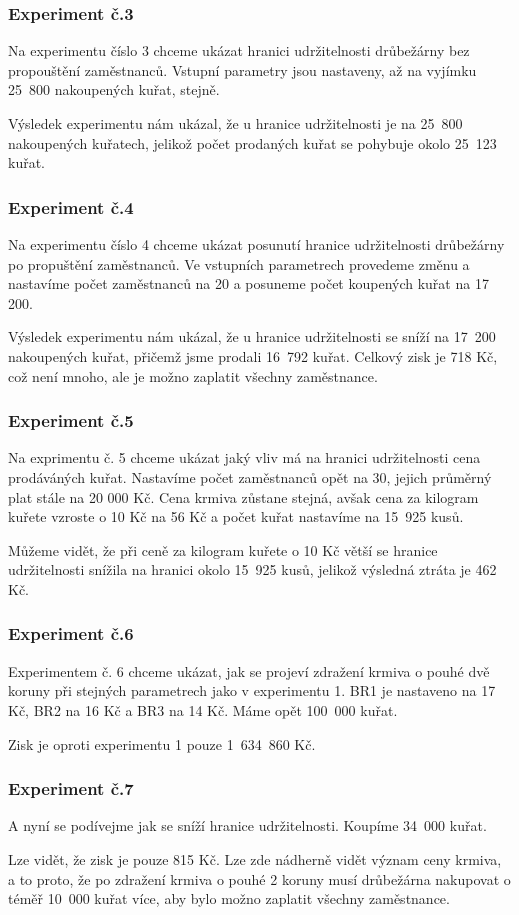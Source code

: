 \documentclass[a4paper,10pt]{article}
\begin{document}
\subsubsection{Experiment č.3}\label{ex3}
Na experimentu číslo 3 chceme ukázat hranici udržitelnosti drůbežárny bez propouštění
zaměstnanců.
Vstupní parametry jsou nastaveny, až na vyjímku 25~800 nakoupených kuřat, stejně.
\par
Výsledek experimentu nám ukázal, že u hranice udržitelnosti je na 25~800 nakoupených
kuřatech, jelikož počet prodaných kuřat se pohybuje okolo 25~123 kuřat.
\subsubsection{Experiment č.4}
Na experimentu číslo 4 chceme ukázat posunutí hranice udržitelnosti drůbežárny po propuštění
zaměstnanců.
Ve vstupních parametrech provedeme změnu a nastavíme počet zaměstnanců na 20 a posuneme 
počet koupených kuřat na 17 200.
\par
Výsledek experimentu nám ukázal, že u hranice udržitelnosti se sníží na 17~200 nakoupených
kuřat, přičemž jsme prodali 16~792 kuřat. Celkový zisk je 718 Kč, což není mnoho, ale je možno
zaplatit všechny zaměstnance.
\subsubsection{Experiment č.5}
Na exprimentu č. 5 chceme ukázat jaký vliv má na hranici udržitelnosti cena prodáváných kuřat.
Nastavíme počet zaměstnanců opět na 30, jejich průměrný plat stále na 20 000 Kč. Cena krmiva zůstane stejná,
avšak cena za kilogram kuřete vzroste o 10 Kč na 56 Kč a počet kuřat nastavíme na 15~925 kusů.
\par
Můžeme vidět, že při ceně za kilogram kuřete o 10 Kč větší se hranice udržitelnosti snížila na hranici okolo 15~925 kusů,
jelikož výsledná ztráta je 462 Kč.
\subsubsection{Experiment č.6}
Experimentem č. 6 chceme ukázat, jak se projeví zdražení krmiva o pouhé dvě koruny při stejných parametrech jako 
v experimentu 1. BR1 je nastaveno na 17 Kč, BR2 na 16 Kč a BR3 na 14 Kč. Máme opět 100~000 kuřat.
\par
Zisk je oproti experimentu 1 pouze 1~634~860 Kč.
\subsubsection{Experiment č.7}
A nyní se podívejme jak se sníží hranice udržitelnosti. Koupíme 34~000 kuřat.
\par
Lze vidět, že zisk je pouze 815 Kč. Lze zde nádherně vidět význam ceny krmiva, a to proto,
že po zdražení krmiva o pouhé 2 koruny musí drůbežárna nakupovat o téměř
10~000 kuřat více, aby bylo možno zaplatit všechny zaměstnance.
\end{document}
